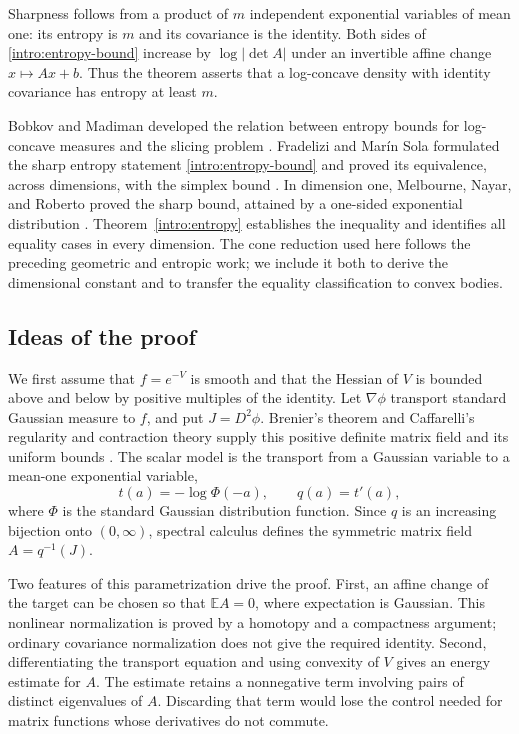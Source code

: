 \documentclass[11pt]{article}
\newcommand{\E}{\mathbb E}
\theoremstyle{definition}
\theoremstyle{remark}
\numberwithin{equation}{section}
\begin{document}
Sharpness follows from a product of $m$ independent exponential variables
of mean one: its entropy is $m$ and its covariance is the identity.
Both sides of \eqref{intro:entropy-bound} increase by $\log|\det A|$
under an invertible affine change $x\mapsto Ax+b$.  Thus the theorem
asserts that a log-concave density with identity covariance has entropy
at least $m$.

Bobkov and Madiman developed the relation between entropy bounds for
log-concave measures and the slicing problem \cite{BobkovMadiman2011}.
Fradelizi and Mar\'in Sola formulated the sharp entropy statement
\eqref{intro:entropy-bound} and proved its equivalence, across dimensions,
with the simplex bound \cite[Conjecture~3(iii) and Proposition~5.2]{FradeliziMarinSola2026}.
In dimension one, Melbourne, Nayar, and Roberto proved the sharp bound,
attained by a one-sided exponential distribution
\cite[Theorem~1.1]{MelbourneNayarRoberto2026}.
Theorem~\ref{intro:entropy} establishes the inequality and identifies
all equality cases in every dimension.
The cone reduction used here follows the preceding geometric and
entropic work; we include it both to derive the dimensional constant
and to transfer the equality classification to convex bodies.

\subsection{Ideas of the proof}

We first assume that $f=e^{-V}$ is smooth and that the Hessian of $V$ is
bounded above and below by positive multiples of the identity.
Let $\nabla\phi$ transport standard Gaussian measure to $f$, and put
$J=D^2\phi$.  Brenier's theorem and Caffarelli's regularity and
contraction theory supply this positive definite matrix field and its
uniform bounds
\cite{Brenier1991,McCann1995,Caffarelli2000,CorderoErausquinFigalli2019}.
The scalar model is the transport from a Gaussian variable to a
mean-one exponential variable,
\[
 t(a)=-\log\Phi(-a),\qquad q(a)=t'(a),
\]
where $\Phi$ is the standard Gaussian distribution function.  Since $q$
is an increasing bijection onto $(0,\infty)$, spectral calculus defines
the symmetric matrix field $A=q^{-1}(J)$.

Two features of this parametrization drive the proof.  First, an affine
change of the target can be chosen so that $\E A=0$, where expectation
is Gaussian.  This nonlinear normalization is proved by a homotopy and
a compactness argument; ordinary covariance normalization does not
give the required identity.  Second, differentiating the transport
equation and using convexity of $V$ gives an energy estimate for $A$.
The estimate retains a nonnegative term involving pairs of distinct
eigenvalues of $A$.  Discarding that term would lose the control needed
for matrix functions whose derivatives do not commute.
\end{document}
